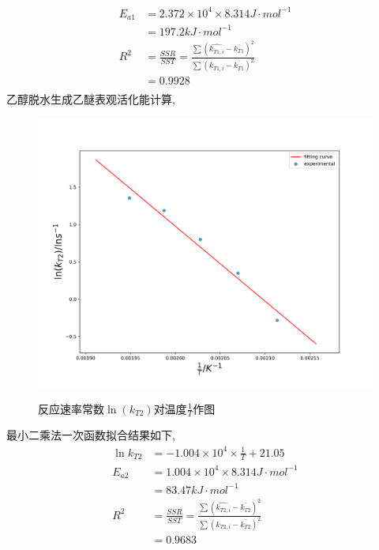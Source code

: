 \documentclass[a4paper]{article}
\begin{document}
\begin{enumerate}
\begin{equation}
\begin{aligned}
		E_{a1} &= 2.372\times 10^{4} \times 8.314 J\cdot mol^{-1}\\
		       &= 197.2 kJ\cdot mol^{-1}\\
		R^{2} &= \frac{SSR}{SST} = \frac{\sum{(\hat{k_{T1,i}}-\bar{k_{T1}})^{2}}}{\sum{(k_{T1,i}-\bar{k_{T1}})^{2}}}\\
					&=0.9928\\
	\end{aligned}
\end{equation}
乙醇脱水生成乙醚表观活化能计算,
\begin{figure}[H]
	\centering
	\includegraphics[width=0.50\paperwidth]{fig/kT2.png}\\
	\caption{反应速率常数$\ln(k_{T2})$对温度$\frac{1}{T}$作图}
\end{figure}
最小二乘法一次函数拟合结果如下,
\begin{equation}
	\begin{aligned}
		\ln k_{T2} &= -1.004\times 10^{4} \times \frac{1}{T} + 21.05\\
		E_{a2} &= 1.004\times 10^{4} \times 8.314 J\cdot mol^{-1}\\
				&= 83.47 kJ\cdot mol^{-1}\\
		R^{2} &= \frac{SSR}{SST} = \frac{\sum{(\hat{k_{T2,i}}-\bar{k_{T2}})^{2}}}{\sum{(k_{T2,i}-\bar{k_{T2}})^{2}}}\\
					&=0.9683\\
	\end{aligned}
\end{equation}


\end{enumerate}
\newpage
\end{document}
